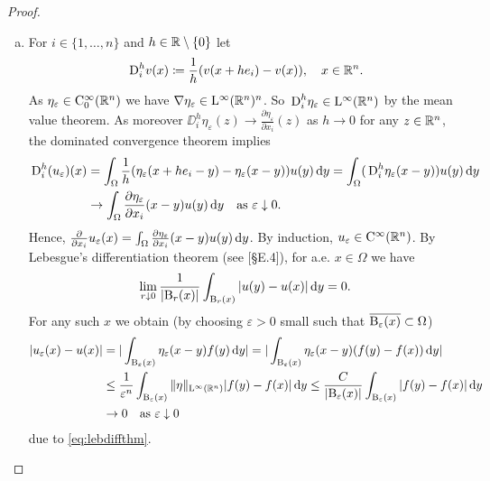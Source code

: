 \begin{proof}
  \begin{enumerate}[a)]
    \item For $i \in \{1, \dots, n\}$ and $h \in \mathbb{R} \setminus\{0\}$ let
    $$
    \,{\operatorname{D}}^h_i v(x) \coloneqq \frac{1}{h} ( v(x + h e_i) - v(x)), \quad x \in \mathbb{R}^n.
    $$
    As $\eta_\varepsilon \in \mathrm{C}_0^\infty(\mathbb{R}^n)$ we have $\nabla \eta_\varepsilon \in \mathrm{L}^\infty(\mathbb{R}^n)^n$.
    So $\,{\operatorname{D}}_i^h  \eta_\varepsilon \in \mathrm{L}^\infty(\mathbb{R}^n)$ by the mean value theorem.
    As moreover $\DD_i^h \eta_\varepsilon(z) \to \frac{\partial \eta_\varepsilon}{\partial x_i}(z)$ as $h \to 0$ for any $z \in \mathbb{R}^n$, the dominated convergence theorem implies
    \begin{align*}
      \,{\operatorname{D}}_i^h (u_\varepsilon)(x)
    &= \int_\Omega \frac{1}{h} (\eta_\varepsilon(x + h e_i - y) - \eta_\varepsilon (x - y)) u(y) \, {\operatorname{d}\!{y}} 
    = \int_\Omega (\,{\operatorname{D}}_i^h \eta_\varepsilon (x - y)) u(y) \, {\operatorname{d}\!{y}}  \\
    &\to \int_\Omega \frac{\partial \eta_\varepsilon}{\partial x_i}(x - y) u(y) \, {\operatorname{d}\!{y}} \quad\text{as } \varepsilon \downarrow 0.
    \end{align*}
    Hence, $\frac{\partial}{\partial x_i} u_\varepsilon(x) = \int_\Omega \frac{\partial \eta_\varepsilon}{\partial x_i} (x - y) u(y) \, {\operatorname{d}\!{y}}$.
    By induction, $u_\varepsilon \in \mathrm{C}^\infty(\mathbb{R}^n)$.
    By Lebesgue's differentiation theorem (see \cite{evans2010partial}[\S E.4]), for a.e. $x \in \Omega$ we have
    \begin{equation}
      \lim_{r \downarrow 0} \frac{1}{|\mathrm{B}_r(x)|} \int_{\mathrm{B}_r(x)} |u(y) - u(x)| \, {\operatorname{d}\!{y}} = 0.
      \label{eq:lebdiffthm}
    \end{equation}
    For any such $x$ we obtain (by choosing $\varepsilon > 0$ small such that $\overline{\mathrm{B}_\varepsilon(x)} \subset \Omega$)
    \begin{align}
      |u_\varepsilon(x) - u(x)|
      &= | \int_{\mathrm{B}_\varepsilon(x)} \eta_\varepsilon (x - y) f(y) \, {\operatorname{d}\!{y}} | 
      = | \int_{\mathrm{B}_\varepsilon(x)} \eta_\varepsilon (x - y) (f(y) - f(x)) \, {\operatorname{d}\!{y}} | \nonumber\\
      &\leq \frac{1}{\varepsilon^n} \int_{\mathrm{B}_\varepsilon(x)} \|\eta\|_{\mathrm{L}^\infty(\mathbb{R}^n)} |f(y) - f(x)| \, {\operatorname{d}\!{y}} \leq \frac{C}{|\mathrm{B}_\varepsilon(x)|} \int_{\mathrm{B}_\varepsilon(x)} |f(y) - f(x) | \, {\operatorname{d}\!{y}} \label{eq:pointwise}\\
      & \to 0 \quad\text{as } \varepsilon \downarrow 0 \nonumber
    \end{align}
    due to \eqref{eq:lebdiffthm}.
    

\end{enumerate}
\end{proof}
